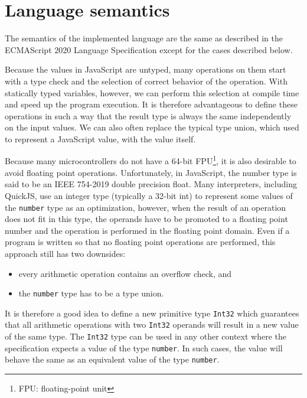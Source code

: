 \section{Language semantics}

The semantics of the implemented language are the same as described in the ECMAScript 2020 Language Specification\cite{ecma262} except for the cases described below.

Because the values in JavaScript are untyped, many operations on them start with a type check and the selection of correct behavior of the operation. With statically typed variables, however, we can perform this selection at compile time and speed up the program execution. It is therefore advantageous to define these operations in such a way that the result type is always the same independently on the input values. We can also often replace the typical type union, which used to represent a JavaScript value, with the value itself.

Because many microcontrollers do not have a 64-bit FPU\footnote{FPU: floating-point unit}, it is also desirable to avoid floating point operations. Unfortunately, in JavaScript, the number type is said to be an IEEE 754-2019 double precision float\cite{ieee754}. Many interpreters, including QuickJS, use an integer type (typically a 32-bit int) to represent some values of the \texttt{number} type as an optimization, however, when the result of an operation does not fit in this type, the operands have to be promoted to a floating point number and the operation is performed in the floating point domain. Even if a program is written so that no floating point operations are performed, this approach still has two downsides:
\begin{itemize}
    \item every arithmetic operation contains an overflow check, and
    \item the \texttt{number} type has to be a type union.
\end{itemize}

It is therefore a good idea to define a new primitive type \texttt{Int32} which guarantees that all arithmetic operations with two \texttt{Int32} operands will result in a new value of the same type. The \texttt{Int32} type can be used in any other context where the specification expects a value of the type \texttt{number}. In such cases, the value will behave the same as an equivalent value of the type \texttt{number}.


